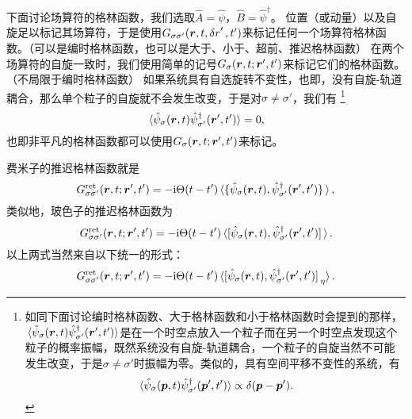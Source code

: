 \documentclass[hyperref, UTF8, a4paper]{ctexart}
\newcommand*{\ii}{\mathrm{i}}
\begin{document}

下面讨论场算符的格林函数，我们选取$\hat{A} = \hat{\psi}$，$\hat{B} = \hat{\psi}^\dagger$。
位置（或动量）以及自旋足以标记其场算符，于是使用$G_{\sigma \sigma'}(\vb*{r}, t, \var{r}', t')$来标记任何一个场算符格林函数。（可以是编时格林函数，也可以是大于、小于、超前、推迟格林函数）
在两个场算符的自旋一致时，我们使用简单的记号$G_{\sigma}(\vb*{r}, t; \vb*{r}', t')$来标记它们的格林函数。（不局限于编时格林函数）
如果系统具有自选旋转不变性，也即，没有自旋-轨道耦合，那么单个粒子的自旋就不会发生改变，于是对$\sigma \neq \sigma'$，我们有%
\footnote{如同下面讨论编时格林函数、大于格林函数和小于格林函数时会提到的那样，$\expval*{\hat{\psi}_{\sigma}(\vb*{r}, t) \hat{\psi}^\dagger_{\sigma'} (\vb*{r}', t')}$是在一个时空点放入一个粒子而在另一个时空点发现这个粒子的概率振幅，既然系统没有自旋-轨道耦合，一个粒子的自旋当然不可能发生改变，于是$\sigma\neq \sigma'$时振幅为零。类似的，具有空间平移不变性的系统，有
\[
    \expval*{\hat{\psi}_{\sigma}(\vb*{p}, t) \hat{\psi}^\dagger_{\sigma'} (\vb*{p}', t')} \propto \delta(\vb*{p} - \vb*{p}').
\]
}%
\[
    \expval*{\hat{\psi}_{\sigma}(\vb*{r}, t) \hat{\psi}^\dagger_{\sigma'} (\vb*{r}', t')} = 0,
\]
也即非平凡的格林函数都可以使用$G_{\sigma}(\vb*{r}, t; \vb*{r}', t')$来标记。

费米子的推迟格林函数就是
\begin{equation}
    G^\text{ret}_{\sigma \sigma'}(\vb*{r}, t; \vb*{r}', t') = - \ii \Theta(t-t') \expval*{\acomm*{\hat{\psi}_\sigma (\vb*{r}, t)}{\hat{\psi}_{\sigma'}^\dagger(\vb*{r}', t')}},
\end{equation}
类似地，玻色子的推迟格林函数为
\begin{equation}
    G^\text{ret}_{\sigma \sigma'}(\vb*{r}, t; \vb*{r}', t') = - \ii \Theta(t-t') \expval*{\comm*{\hat{\psi}_\sigma (\vb*{r}, t)}{\hat{\psi}_{\sigma'}^\dagger(\vb*{r}', t')}}.
\end{equation}
以上两式当然来自以下统一的形式：
\begin{equation}
    G^\text{ret}_{\sigma \sigma'}(\vb*{r}, t; \vb*{r}', t') = - \ii \Theta(t-t') \expval*{\comm*{\hat{\psi}_\sigma (\vb*{r}, t)}{\hat{\psi}_{\sigma'}^\dagger(\vb*{r}', t')}_\eta}.
\end{equation}
\end{document}
